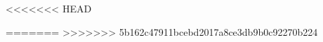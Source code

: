 \documentclass[a4,11pt]{book}
\begin{document}
\frontmatter



\newpage



\newpage



\newpage


<<<<<<< HEAD


\newpage

=======
\newpage
>>>>>>> 5b162c47911bcebd2017a8ce3db9b0c92270b224


\tableofcontents 
 
\mainmatter


















%

\backmatter

%
%
%
%
%
%
\end{document}
